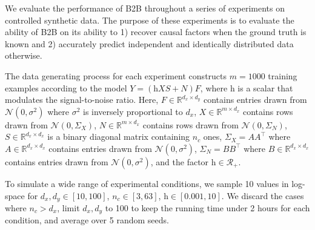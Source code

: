 We evaluate the performance of B2B throughout a series of experiments on
controlled synthetic data.
%
The purpose of these experiments is to evaluate the ability of B2B on its
ability to 1) recover causal factors when the ground truth is known and 2)
accurately predict independent and identically distributed data otherwise.

The data generating process for each experiment constructs $m=1000$ training examples
according to the model $Y = (\text{h} XS + N)F$, where $\text{h}$ is a
scalar that modulates the signal-to-noise ratio.
%
Here,
    $F \in \mathbb{R}^{d_x \times d_y}$ contains entries drawn from
$\mathcal{N}(0, \sigma^2)$ where $\sigma^2$ is inversely proportional to $d_x$,
$X \in \mathbb{R}^{m \times d_x}$ contains rows
drawn from $\mathcal{N}(0, \Sigma_X)$, $N \in \mathbb{R}^{m \times d_x}$
contains rows drawn from $\mathcal{N}(0, \Sigma_N)$, $S \in \mathbb{R}^{d_x
\times d_x}$ is a binary diagonal matrix containing $n_c$ ones, $\Sigma_X =
AA^\top$ where $A \in \mathbb{R}^{d_x \times d_x}$ contains entries drawn from
$\mathcal{N}(0, \sigma^2)$, $\Sigma_N = BB^\top$ where $B \in \mathbb{R}^{d_x
\times d_x}$ contains entries drawn from $\mathcal{N}(0, \sigma^2)$, and the
factor $\text{h} \in \mathcal{R}_+$.

To simulate a wide range of experimental conditions, we sample 10 values in log-space for $d_x, d_y \in \left[ 10, 100 \right]$, $n_c \in \left[ 3, 63 \right]$,
$\text{h} \in \left[ 0.001, 10 \right]$. We discard the cases where $n_c > d_x$, limit $d_x, d_y$ to 100 to keep the running time under 2 hours for each condition, and average over 5 random seeds.
%

